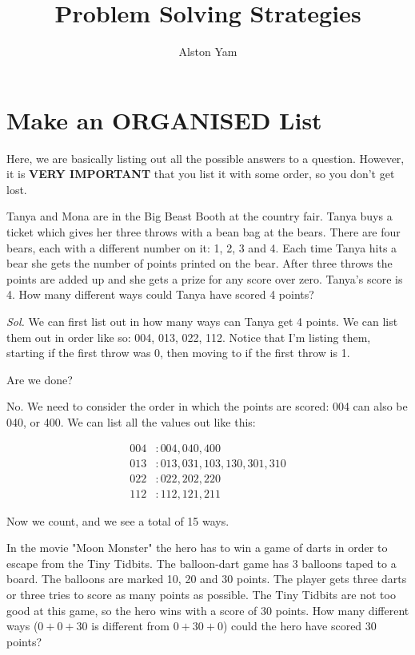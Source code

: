 \documentclass{article}
\title{Problem Solving Strategies}
\author{Alston Yam}
\theoremstyle{mytheoremstyle}
\theoremstyle{mytheoremstyle}
\theoremstyle{myproblemstyle}
\theoremstyle{myproblemstyle}
\begin{document}
    \maketitle

    \section{Make an ORGANISED List}
    Here, we are basically listing out all the possible answers to a question. However, it is \textbf{VERY IMPORTANT} that you list it with some order, so you don't get lost.

    \begin{example}
        Tanya and Mona are in the Big Beast Booth at the country fair. Tanya buys a ticket which gives her three throws with a bean bag at the bears. There are four bears, each with a different number on it: 1, 2, 3 and 4. Each time Tanya hits a bear she gets the number of points printed on the bear. After three throws the points are added up and she gets a prize for any score over zero. Tanya's score is 4. How many different ways could Tanya have scored 4 points?
    \end{example}

    \textit{ Sol. }We can first list out in how many ways can Tanya get 4 points. We can list them out in order like so: 004, 013, 022, 112. Notice that I'm listing them, starting if the first throw was 0, then moving to if the first throw is 1. 

    Are we done?

    No. We need to consider the order in which the points are scored: 004 can also be 040, or 400. We can list all the values out like this:

    \begin{align*}
        004 &: 004, 040, 400\\
        013 &: 013, 031, 103, 130, 301, 310\\
        022 &: 022, 202, 220 \\
        112 &: 112, 121, 211
    \end{align*}

    Now we count, and we see a total of 15 ways.

    \begin{problem}
        In the movie "Moon Monster" the hero has to win a game of darts in order to escape from the Tiny Tidbits. The balloon-dart game has 3 balloons taped to a board. The balloons are marked 10, 20 and 30 points. The player gets three darts or three tries to score as many points as possible. The Tiny Tidbits are not too good at this game, so the hero wins with a score of 30 points. How many different ways ($0+0+30$ is different from $0+30+0$) could the hero have scored 30 points? 
    \end{problem}
\end{document}
